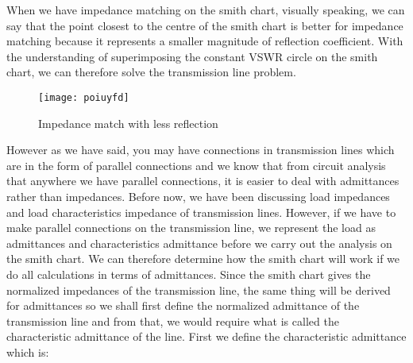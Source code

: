     When we have impedance matching on the smith chart, visually speaking, we can say that the point closest to the centre of the smith chart is better for impedance matching because it represents a smaller magnitude of reflection coefficient. With the understanding of superimposing the constant VSWR circle on the smith chart, we can therefore solve the transmission line problem.
    \begin{figure}[h]
    	\centering
    	\texttt{[image: poiuyfd]}
    	\caption{Impedance match with less reflection}
    	\label{fig:poiuyfd}
    \end{figure}

     However as we have said, you may have connections in transmission lines which are in the form of parallel connections and we know that from circuit analysis that anywhere we have parallel connections, it is easier to deal with admittances rather than impedances. Before now, we have been discussing load impedances and load characteristics impedance of transmission lines. However, if we have to make parallel connections on the transmission line, we represent the load as admittances and characteristics admittance before we carry out the analysis on the smith chart. We can therefore determine how the smith chart will work if we do all calculations in terms of admittances. Since the smith chart gives the normalized impedances of the transmission line, the same thing will be derived for admittances so we shall first define the normalized admittance of the transmission line and from that, we would require what is called the characteristic admittance of the line. First we define the characteristic admittance which is:
